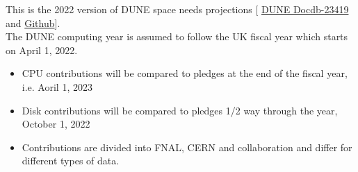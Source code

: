 This is the 2022 version of DUNE space needs projections [
\href{https://docs.dunescience.org/cgi-bin/sso/ShowDocument?docid=23419}{DUNE Docdb-23419} and \href{https://github.com/DUNE/Computing-CDR/tree/master/Jupyter/Numbers}{Github}].\\

The DUNE computing year is assumed to follow the UK fiscal year which starts on April 1, 2022. \\

\begin{itemize}
\item CPU contributions will be compared to pledges at the end of the fiscal year, i.e. Aoril 1, 2023

\item Disk contributions will be compared to pledges 1/2 way through the year, October 1, 2022

\item Contributions are divided into FNAL, CERN and collaboration and differ for different types of data. 

\end{itemize}
\pagebreak